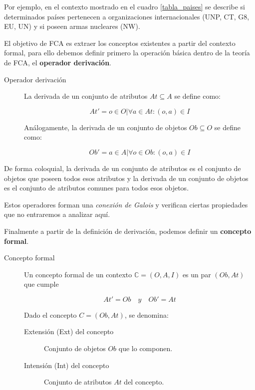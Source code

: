 	Por ejemplo, en el contexto mostrado en el cuadro \ref{tabla_paises} se describe si determinados países pertenecen a organizaciones internacionales (UNP, CT, G8, EU, UN) y si poseen armas nucleares (NW).
	
	El objetivo de FCA es extraer los conceptos existentes a partir del contexto formal, para ello debemos definir primero la operación básica dentro de la teoría de FCA, el \textbf{operador derivación}.
	
	\begin{description}
		\item[Operador derivación] La derivada de un conjunto de atributos $At \subseteq A$ se define como: 
		
		\[ At' = {o \in O | \forall a \in At : (o, a) \in I} \]
		
		Análogamente, la derivada de un conjunto de objetos $Ob \subseteq O$ se define como:
		
		\[ Ob' = {a \in A | \forall o \in Ob : (o, a) \in I} \]
		
	\end{description}

	De forma coloquial, la derivada de un conjunto de atributos es el conjunto de objetos que poseen todos esos atributos y la derivada de un conjunto de objetos es el conjunto de atributos comunes para todos esos objetos.
	
	Estos operadores forman una \textit{conexión de Galois} y verifican ciertas propiedades que no entraremos a analizar aquí.
	
	
	Finalmente a partir de la definición de derivación, podemos definir un \textbf{concepto formal}.
	
	\begin{description}
		\item[Concepto formal] Un concepto formal de un contexto $\mathbb{C} = (O,A,I)$ es un par $(Ob,At)$ que cumple
		
		\[ At' = Ob \quad y \quad Ob' = At		\] 
		
		Dado el concepto $C = (Ob, At)$, se denomina: 
		\begin{description}
			\item[Extensión (Ext) del concepto] Conjunto de objetos $Ob$ que lo componen.
			\item[Intensión (Int) del concepto] Conjunto de atributos $At$ del concepto. 
		\end{description}
	\end{description}
	
